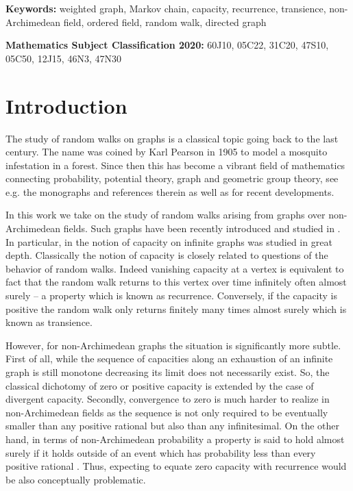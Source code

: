 \documentclass[a4paper,oneside, 12pt]{amsart}
\numberwithin{theorem}{section}
\theoremstyle{definition}
\begin{document}
{\footnotesize
{\bf Keywords:} {weighted graph, Markov chain, capacity, recurrence, transience, non-Archimedean field, ordered field, random walk, directed graph} 
\smallskip

{\bf Mathematics Subject Classification 2020: }{60J10, 05C22, 31C20, 47S10, 05C50, 12J15,  	46N3, 47N30} 


\section{Introduction}

The study of random walks on graphs is a classical topic going back to the last century. The name was coined by  Karl Pearson in 1905 \cite{Pearson} to  model a mosquito infestation in a forest. Since then this has become a vibrant field of mathematics connecting probability, potential theory, graph and geometric group theory, see e.g. the monographs \cite{LyonsPeres,Woess00,Woess09} and references therein as well as \cite{BosiHuPeres,Cenac,Kumamoto} for recent developments. 

In this work we take on the study of random walks arising from graphs over non-Archimedean fields. Such graphs have been recently introduced and studied in \cite{Muranova1,Muranova2,OurPreprint}. In particular, in \cite{OurPreprint} the notion of capacity on infinite graphs was studied in great depth. Classically the notion of capacity is closely related to questions of the behavior of random walks. Indeed vanishing capacity at a vertex is equivalent to fact that the random walk returns to this vertex over time infinitely often almost surely -- a property which is known as recurrence. Conversely, if the capacity is positive the random walk only returns finitely many times almost surely which is known as transience.

However, for non-Archimedean graphs the situation is significantly more subtle. First of all, while the sequence of capacities along an exhaustion of an infinite graph is still monotone decreasing its limit does not necessarily exist. So, the classical dichotomy of zero or positive capacity is extended by the case of divergent capacity. Secondly, convergence to zero is much harder to realize in non-Archimedean fields as the sequence is not only required to be eventually smaller than any positive rational but also than any infinitesimal. On the other hand, in terms of non-Archimedean probability   a property is said to hold almost surely if it holds outside of an event  which has probability less than every positive rational \cite[p.~25]{Nelson}. Thus, expecting to equate zero capacity with recurrence would be also conceptually problematic.

}
\end{document}
